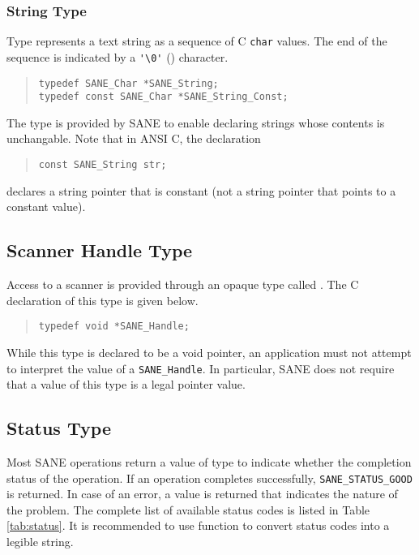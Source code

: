 \documentclass[11pt,DVIps]{report}
\begin{document}
\subsubsection{String Type}

Type  represents a text string as a sequence
of C \verb|char| values.  The end of the sequence is indicated by a
\verb|'\0'| () character.  
\begin{quote}
\begin{verbatim}
typedef SANE_Char *SANE_String;
typedef const SANE_Char *SANE_String_Const;
\end{verbatim}
\end{quote}
The type  is provided by SANE to
enable declaring strings whose contents is unchangable.  Note that in
ANSI C, the declaration
\begin{quote}
\begin{verbatim}
const SANE_String str;
\end{verbatim}
\end{quote}
declares a string pointer that is constant (not a string pointer that
points to a constant value).


\subsection{Scanner Handle Type}

Access to a scanner is provided through an opaque type called
.  The C declaration of this type is given
below.
\begin{quote}
\begin{verbatim}
typedef void *SANE_Handle;
\end{verbatim}
\end{quote}
While this type is declared to be a void pointer, an application must
not attempt to interpret the value of a \verb|SANE_Handle|.  In
particular, SANE does not require that a value of this type is a legal
pointer value.


\subsection{Status Type}

Most SANE operations return a value of type 
to indicate whether the completion status of the operation.  If an
operation completes successfully, \verb|SANE_STATUS_GOOD| is returned.
In case of an error, a value is returned that indicates the nature of
the problem.  The complete list of available status codes is listed in
Table \ref{tab:status}.  It is recommended to use function
 to convert status codes into a legible
string.
\end{document}
